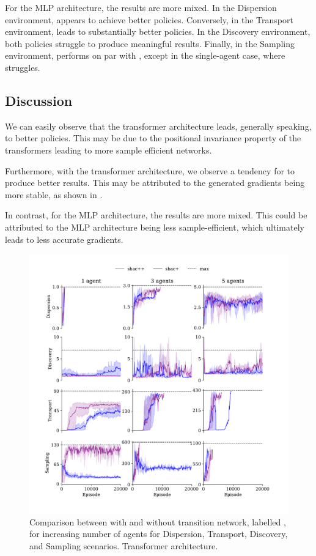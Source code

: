 For the MLP architecture, the results are more mixed. In the Dispersion environment, \fname{} appears to achieve better policies. Conversely, in the Transport environment, \fnamer{} leads to substantially better policies. In the Discovery environment, both policies struggle to produce meaningful results. Finally, in the Sampling environment, \fname{} performs on par with \fnamer{}, except in the single-agent case, where \fnamer{} struggles.

\subsection{Discussion}
We can easily observe that the transformer architecture leads, generally speaking, to better policies. This may be due to the positional invariance property of the transformers leading to more sample efficient networks. 

Furthermore, with the transformer architecture, we observe a tendency for \fname{} to produce better results. This may be attributed to the generated gradients being more stable, as shown in .

In contrast, for the MLP architecture, the results are more mixed. This could be attributed to the MLP architecture being less sample-efficient, which ultimately leads to less accurate gradients.

\begin{figure}[t]
    \centering
    \includegraphics[width=\textwidth]{figs/ablation-transformer.pdf}
    \caption{Comparison between \fname{} with and without transition network, labelled \fnamer{}, for increasing number of agents for Dispersion, Transport, Discovery, and Sampling scenarios. Transformer architecture.}
    \label{fig:ablation-transformer}\vspace{0.5cm}
\end{figure}

